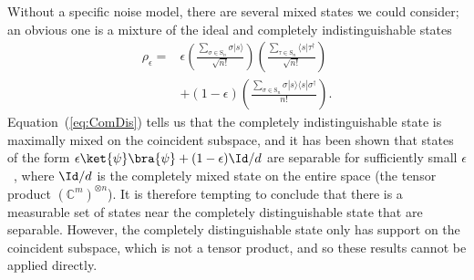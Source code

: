 Without a specific noise model, there are several mixed states we could consider; an obvious one is a mixture of the ideal and completely indistinguishable states
\begin{align}
\label{eq:Werner}
\rho_\epsilon 
=& \epsilon\left(\frac{\sum_{\sigma \in  \textrm{S}_n}\sigma|s\rangle}{\sqrt{n!}}\right)\left(\frac{\sum_{\tau \in  \textrm{S}_n}\langle s|\tau^\dagger}{\sqrt{n!}}\right) \\
& + (1-\epsilon)\left(\frac{\sum_{\sigma \in  \textrm{S}_n}\sigma|s\rangle\langle s|\sigma^\dagger}{{n!}}\right).
\end{align}
Equation~(\ref{eq:ComDis}) tells us that the completely indistinguishable state is maximally mixed on the coincident subspace, and it has been shown that states of the form $\epsilon\ket{\psi}\bra{\psi} + (1-\epsilon)\Id/d$ are separable for sufficiently small $\epsilon$~\cite{braunstein1999, rungta2001}, where $\Id/d$ is the completely mixed state on the entire space (the tensor product $(\mathbb{C}^m)^{\otimes n}$).
It is therefore tempting to conclude that there is a measurable set of states near the completely distinguishable state that are separable.
However, the completely distinguishable state only has support on the coincident subspace, which is not a tensor product, and so these results cannot be applied directly.


